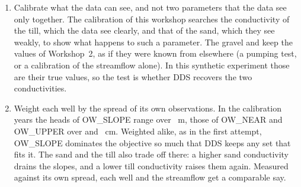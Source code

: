 \begin{enumerate}
\item Calibrate what the data can see, and not two parameters that the data see only together. The calibration of this
  workshop searches the conductivity of the till, which the data see clearly, and that of the sand, which they see weakly,
  to show what happens to such a parameter. The gravel and  keep the values of Workshop~2, as if they were
  known from elsewhere (a pumping test, or a calibration of the streamflow alone). In this synthetic experiment those are
  their true values, so the test is whether DDS recovers the two conductivities.
\item Weight each well by the spread of its own observations. In the calibration years the heads of OW\_SLOPE range over
  ~m, those of OW\_NEAR and OW\_UPPER over  and ~cm. Weighted alike, as in the
  first attempt, OW\_SLOPE dominates the objective so much that DDS keeps any set that fits it. The sand and the till also
  trade off there: a higher sand conductivity drains the slopes, and a lower till conductivity raises them again. Measured
  against its own spread, each well and the streamflow get a comparable say.
\end{enumerate}
